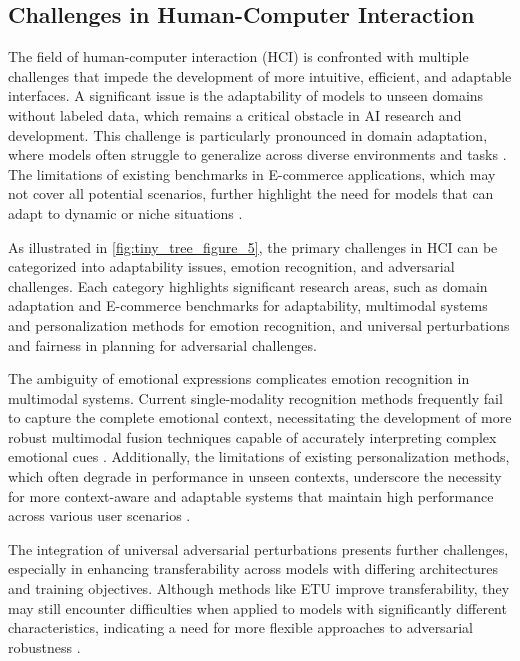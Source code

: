 \subsection{Challenges in Human-Computer Interaction} \label{subsec:Challenges in Human-Computer Interaction}

The field of human-computer interaction (HCI) is confronted with multiple challenges that impede the development of more intuitive, efficient, and adaptable interfaces. A significant issue is the adaptability of models to unseen domains without labeled data, which remains a critical obstacle in AI research and development. This challenge is particularly pronounced in domain adaptation, where models often struggle to generalize across diverse environments and tasks \cite{park2023domainadaptationbasedhuman}. The limitations of existing benchmarks in E-commerce applications, which may not cover all potential scenarios, further highlight the need for models that can adapt to dynamic or niche situations \cite{li2023ecomgptinstructiontuninglargelanguage}.

As illustrated in \autoref{fig:tiny_tree_figure_5}, the primary challenges in HCI can be categorized into adaptability issues, emotion recognition, and adversarial challenges. Each category highlights significant research areas, such as domain adaptation and E-commerce benchmarks for adaptability, multimodal systems and personalization methods for emotion recognition, and universal perturbations and fairness in planning for adversarial challenges.

The ambiguity of emotional expressions complicates emotion recognition in multimodal systems. Current single-modality recognition methods frequently fail to capture the complete emotional context, necessitating the development of more robust multimodal fusion techniques capable of accurately interpreting complex emotional cues \cite{zhou2023leveragingtcntransformereffective}. Additionally, the limitations of existing personalization methods, which often degrade in performance in unseen contexts, underscore the necessity for more context-aware and adaptable systems that maintain high performance across various user scenarios \cite{kaur2024cropcontextwiserobuststatic}.

The integration of universal adversarial perturbations presents further challenges, especially in enhancing transferability across models with differing architectures and training objectives. Although methods like ETU improve transferability, they may still encounter difficulties when applied to models with significantly different characteristics, indicating a need for more flexible approaches to adversarial robustness \cite{zhang2024universaladversarialperturbationsvisionlanguage}.

